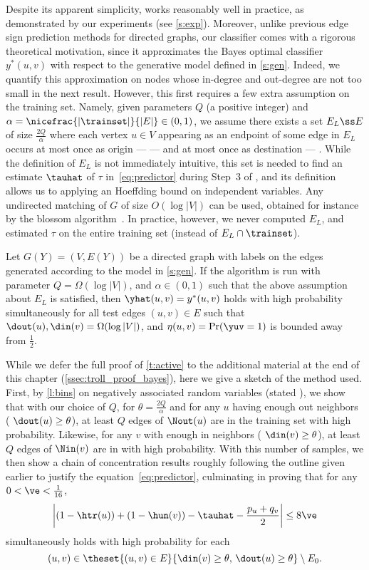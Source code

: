 Despite its apparent simplicity, \usrule{}
works reasonably well in practice, as demonstrated by our experiments (see \autoref{s:exp}).
Moreover, unlike previous edge sign prediction methods for directed graphs, our classifier comes
with a rigorous theoretical motivation, since it approximates the Bayes optimal classifier
$y^*(u,v)$ with respect to the generative model defined in \autoref{s:gen}. Indeed, we quantify this
approximation on nodes whose in-degree and out-degree are not too small in the next result. However,
this first requires a few extra assumption on the training set. Namely, given parameters $Q$ (a
positive integer) and $\alpha = \nicefrac{|\trainset|}{|E|} \in (0,1)$, we assume there exists a set
$E_L \ss E$ of size $\tfrac{2Q}{\alpha}$ where each vertex $u \in V$ appearing as an endpoint of
some edge in $E_L$ occurs at most once as origin ---\ie{} \euv{}--- and at most once as destination
---\ie{} \evu{}. While the definition of $E_L$ is not immediately intuitive, this set is needed to
find an estimate $\tauhat$ of $\tau$ in~\eqref{eq:predictor} during Step~3 of \usrule{}, and its
definition allows us to applying an Hoeffding bound on independent variables. Any undirected
matching of $G$ of size $O(\log|V|)$ can be used, obtained for instance by the blossom
algorithm~\autocite{matching65}. In practice, however, we never computed $E_L$, and estimated $\tau$
on the entire training set \trainset{} (instead of $E_L \cap \trainset$).

\begin{theorem}
  \label{t:active}
  Let $G(Y) = (V,E(Y))$ be a directed graph with labels on the edges generated according to the
  model in \autoref{s:gen}.
  If the algorithm is run with parameter $Q = \Omega(\log|V|)$, and $\alpha \in (0,1)$ such that the
  above assumption about $E_L$ is satisfied, then $\yhat(u,v) = y^*(u,v)$ holds with high probability
  simultaneously for all test edges $(u,v) \in E$ such that $\dout(u),\din(v) = \Omega(\log|V|)$, and
  $\eta(u,v) = \Pr(\yuv=1)$ is bounded away from $\tfrac{1}{2}$.
\end{theorem}

While we defer the full proof of \autoref{t:active} to the additional material at the end of this
chapter (\autoref{ssec:troll_proof_bayes}), here we give a sketch of the method used.
First, by \autoref{l:bins} on negatively associated random variables (stated
), we show that with our choice of $Q$, for $\theta=\frac{2Q}{\alpha}$ and for any
$u$ having enough out neighbors (\ie{} $\dout(u) \ge \theta$), at least $Q$ edges of $\Nout(u)$
are in the training set with high probability. Likewise, for any $v$ with enough in neighbors (\ie
$\din(v) \ge \theta$), at least $Q$ edges of $\Nin(v)$ are in \trainset with high probability.
With this number of samples, we then show a chain of concentration results roughly following the
outline given earlier to justify the equation~\eqref{eq:predictor}, culminating in proving that 
for any $0 < \ve < \tfrac{1}{16}$,
\[ \left| \left( 1 - \htr(u) \right) + \left( 1 - \hun(v) \right) - \tauhat
  - \frac{p_u+q_v}{2} \right| \le 8\ve \]
simultaneously holds with high probability for each \[(u,v) \in \theset{(u,v) \in E}{\din(v) \ge
\theta,\, \dout(u) \ge \theta} \setminus E_0.\]

